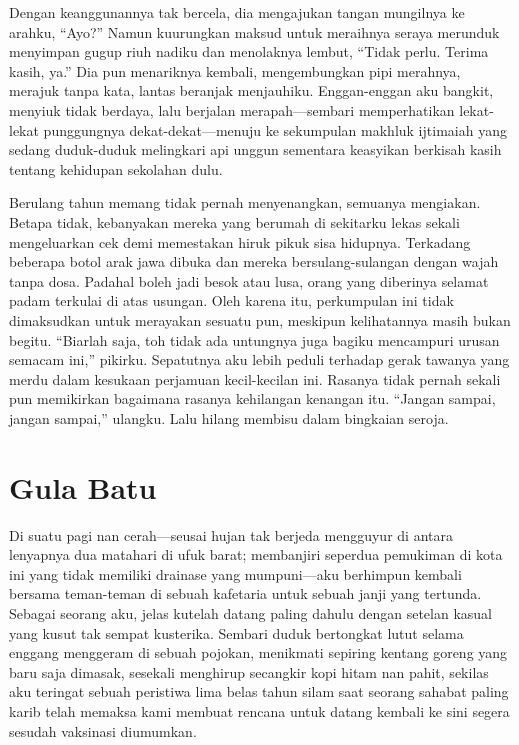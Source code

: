 \documentclass[smalldemyvopaper,11pt,twoside,onecolumn,openright,extrafontsizes]{memoir}
\begin{document}

Dengan keanggunannya tak bercela, dia mengajukan tangan mungilnya ke arahku, ``Ayo?'' Namun kuurungkan maksud untuk meraihnya seraya merunduk menyimpan gugup riuh nadiku dan menolaknya lembut, ``Tidak perlu. Terima kasih, ya.'' Dia pun menariknya kembali, mengembungkan pipi merahnya, merajuk tanpa kata, lantas beranjak menjauhiku. Enggan-enggan aku bangkit, menyiuk tidak berdaya, lalu berjalan merapah---sembari memperhatikan lekat-lekat punggungnya dekat-dekat---menuju ke sekumpulan makhluk ijtimaiah yang sedang duduk-duduk melingkari api unggun sementara keasyikan berkisah kasih tentang kehidupan sekolahan dulu.

Berulang tahun memang tidak pernah menyenangkan, semuanya mengiakan. Betapa tidak, kebanyakan mereka yang berumah di sekitarku lekas sekali mengeluarkan cek demi memestakan hiruk pikuk sisa hidupnya. Terkadang beberapa botol arak jawa dibuka dan mereka bersulang-sulangan dengan wajah tanpa dosa. Padahal boleh jadi besok atau lusa, orang yang diberinya selamat padam terkulai di atas usungan. Oleh karena itu, perkumpulan ini tidak dimaksudkan untuk merayakan sesuatu pun, meskipun kelihatannya masih bukan begitu. ``Biarlah saja, toh tidak ada untungnya juga bagiku mencampuri urusan semacam ini,'' pikirku. Sepatutnya aku lebih peduli terhadap gerak tawanya yang merdu dalam kesukaan perjamuan kecil-kecilan ini. Rasanya tidak pernah sekali pun memikirkan bagaimana rasanya kehilangan kenangan itu. ``Jangan sampai, jangan sampai,'' ulangku. Lalu hilang membisu dalam bingkaian seroja.

\chapter{Gula Batu}


Di suatu pagi nan cerah---seusai hujan tak berjeda mengguyur di antara lenyapnya dua matahari di ufuk barat; membanjiri seperdua pemukiman di kota ini yang tidak memiliki drainase yang mumpuni---aku berhimpun kembali bersama teman-teman di sebuah kafetaria untuk sebuah janji yang tertunda. Sebagai seorang aku, jelas kutelah datang paling dahulu dengan setelan kasual yang kusut tak sempat kusterika. Sembari duduk bertongkat lutut selama enggang menggeram di sebuah pojokan, menikmati sepiring kentang goreng yang baru saja dimasak, sesekali menghirup secangkir kopi hitam nan pahit, sekilas aku teringat sebuah peristiwa lima belas tahun silam saat seorang sahabat paling karib telah memaksa kami membuat rencana untuk datang kembali ke sini segera sesudah vaksinasi diumumkan.
\end{document}
